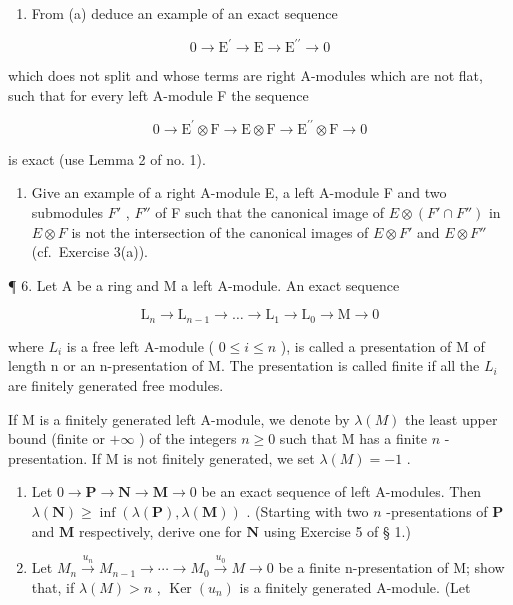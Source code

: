 \begin{enumerate}
\def\labelenumi{(\alph{enumi})}
\setcounter{enumi}{1}
\tightlist
\item
  From (a) deduce an example of an exact sequence
\end{enumerate}

\[
0 \rightarrow \mathrm{E} ^ {\prime} \rightarrow \mathrm{E} \rightarrow \mathrm{E} ^ {\prime \prime} \rightarrow 0
\]

which does not split and whose terms are right A-modules which are not flat, such that for every left A-module F the sequence

\[
0 \rightarrow \mathrm{E} ^ {\prime} \otimes \mathrm{F} \rightarrow \mathrm{E} \otimes \mathrm{F} \rightarrow \mathrm{E} ^ {\prime \prime} \otimes \mathrm{F} \rightarrow 0
\]

is exact (use Lemma 2 of no. 1).

\begin{enumerate}
\def\labelenumi{\arabic{enumi}.}
\setcounter{enumi}{4}
\tightlist
\item
  Give an example of a right A-module E, a left A-module F and two submodules \(F'\) , \(F''\) of F such that the canonical image of \(E \otimes (F' \cap F'')\) in \(E \otimes F\) is not the intersection of the canonical images of \(E \otimes F'\) and \(E \otimes F''\) (cf.~Exercise 3(a)).
\end{enumerate}

¶ 6. Let A be a ring and M a left A-module. An exact sequence

\[
\mathrm{L} _ {n} \rightarrow \mathrm{L} _ {n - 1} \rightarrow \dots \rightarrow \mathrm{L} _ {1} \rightarrow \mathrm{L} _ {0} \rightarrow \mathrm{M} \rightarrow 0
\]

where \(L_{i}\) is a free left A-module ( \(0 \leqslant i \leqslant n\) ), is called a presentation of M of length n or an n-presentation of M. The presentation is called finite if all the \(L_{i}\) are finitely generated free modules.

If M is a finitely generated left A-module, we denote by \(\lambda(M)\) the least upper bound (finite or \(+\infty\) ) of the integers \(n \geqslant 0\) such that M has a finite \(n\) -presentation. If M is not finitely generated, we set \(\lambda(M) = -1\) .

\begin{enumerate}
\def\labelenumi{(\alph{enumi})}
\item
  Let \(0 \to \mathbf{P} \to \mathbf{N} \to \mathbf{M} \to 0\) be an exact sequence of left A-modules. Then \(\lambda(\mathbf{N}) \geqslant \inf(\lambda(\mathbf{P}), \lambda(\mathbf{M}))\) . (Starting with two \(n\) -presentations of \(\mathbf{P}\) and \(\mathbf{M}\) respectively, derive one for \(\mathbf{N}\) using Exercise 5 of § 1.)
\item
  Let \(M_{n} \xrightarrow{u_{n}} M_{n-1} \rightarrow \cdots \rightarrow M_{0} \xrightarrow{u_{0}} M \rightarrow 0\) be a finite n-presentation of M; show that, if \(\lambda(M) > n\) , \(\operatorname{Ker}(u_{n})\) is a finitely generated A-module. (Let
\end{enumerate}

